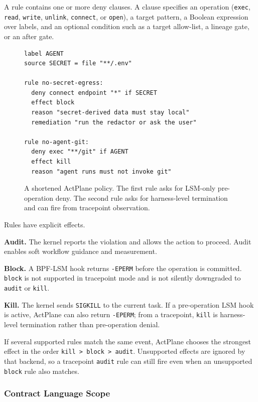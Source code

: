 A rule contains one or more deny clauses. A clause specifies an operation
(\texttt{exec}, \texttt{read}, \texttt{write}, \texttt{unlink},
\texttt{connect}, or \texttt{open}), a target pattern, a Boolean expression over
labels, and an optional condition such as a target allow-list, a lineage gate,
or an after gate.

\begin{figure}[t]
\begin{verbatim}
label AGENT
source SECRET = file "**/.env"

rule no-secret-egress:
  deny connect endpoint "*" if SECRET
  effect block
  reason "secret-derived data must stay local"
  remediation "run the redactor or ask the user"

rule no-agent-git:
  deny exec "**/git" if AGENT
  effect kill
  reason "agent runs must not invoke git"
\end{verbatim}
\caption{A shortened ActPlane policy. The first rule asks for LSM-only
pre-operation deny. The second rule asks for harness-level termination and can
fire from tracepoint observation.}
\label{fig:policy-example}
\end{figure}

Rules have explicit effects.

\textbf{Audit.} The kernel reports the violation and allows the action to
proceed. Audit enables soft workflow guidance and measurement.

\textbf{Block.} A BPF-LSM hook returns \texttt{-EPERM} before the operation is
committed. \texttt{block} is not supported in tracepoint mode and is not
silently downgraded to \texttt{audit} or \texttt{kill}.

\textbf{Kill.} The kernel sends \texttt{SIGKILL} to the current task. If a
pre-operation LSM hook is active, ActPlane can also return \texttt{-EPERM};
from a tracepoint, \texttt{kill} is harness-level termination rather than
pre-operation denial.

If several supported rules match the same event, ActPlane chooses the strongest
effect in the order \texttt{kill > block > audit}. Unsupported effects are
ignored by that backend, so a tracepoint \texttt{audit} rule can still fire even
when an unsupported \texttt{block} rule also matches.

\subsubsection{Contract Language Scope}

